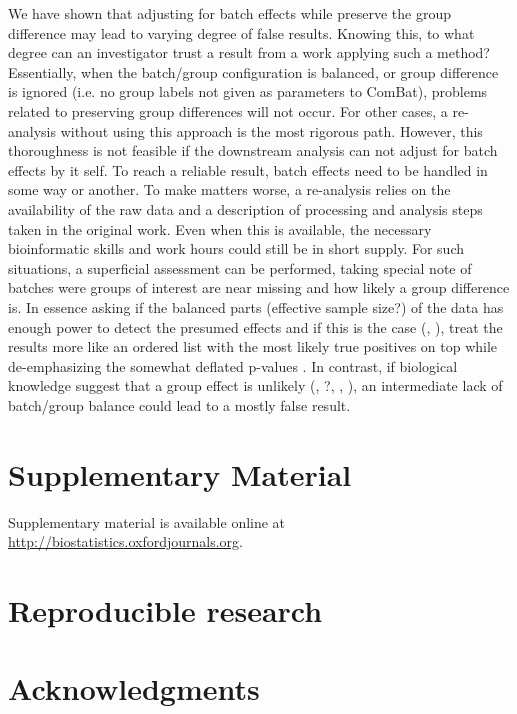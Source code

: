 \documentclass{bio}
\begin{document}
We have shown that adjusting for batch effects while preserve the group difference may lead to varying degree of false results. Knowing this, to what degree can an investigator trust a result from a work applying such a method? Essentially, when the batch/group configuration is balanced, or group difference is ignored  (i.e. no group labels not given as parameters to ComBat), problems related to preserving group differences will not occur. For other cases, a re-analysis without using this approach is the most rigorous path. However, this thoroughness is not feasible if the downstream  analysis can not adjust for batch effects by it self. To reach a reliable result, batch effects need to be handled in some way or another. To make matters worse, a re-analysis relies on the availability of the raw data and a description of processing and analysis steps taken in the original work. Even when this is available, the necessary bioinformatic skills and work hours could still be in short supply. For such situations, a superficial assessment can be performed, taking special note of batches were groups of interest are near missing and how likely a group difference is. In essence asking if the balanced parts (effective sample size?) of the data has enough power to detect the presumed effects and if this is the case (\citealp{Johnson2007}, ), treat the results more like an ordered list with the most likely true positives on top while de-emphasizing the somewhat deflated p-values . In contrast, if biological knowledge suggest that a group effect is unlikely  (, ?, , ), an intermediate lack of batch/group balance  could lead to a mostly false result.


\section{Supplementary Material}
\label{supp}

Supplementary material is available online at
\href{http://biostatistics.oxfordjournals.org}%
{http://biostatistics.oxfordjournals.org}.

\section*{Reproducible research}


\section*{Acknowledgments}
\end{document}
